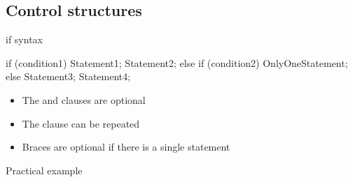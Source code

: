 \subsection[Control]{Control structures}

\begin{frame}[fragile]
  \begin{block}{if syntax}
    \begin{cppcode*}{}
      if (condition1) {
        Statement1; Statement2;
      } else if (condition2)
        OnlyOneStatement;
      else {
        Statement3;
        Statement4;
      }
    \end{cppcode*}
    \begin{itemize}
      \item The  and  clauses are optional
      \item The  clause can be repeated
      \item Braces are optional if there is a single statement
    \end{itemize}
  \end{block}
\end{frame}

\begin{frame}[fragile]
  \begin{exampleblock}{Practical example}
  \end{exampleblock}
\end{frame}

